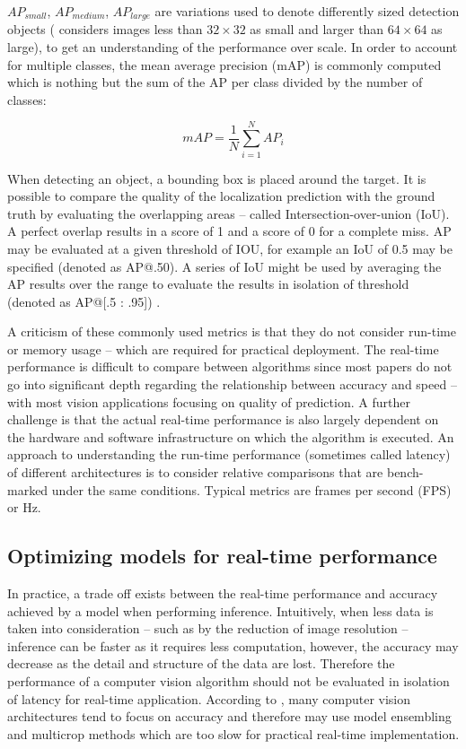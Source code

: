 \documentclass[a4paper,twoside,12pt]{report}
\begin{document}
$AP_{small}$, $AP_{medium}$, $AP_{large}$ are variations used to denote differently sized detection objects (\cite{cocoeval} considers images less than $32 \times 32$ as small and larger than $64 \times 64$ as large), to get an understanding of the performance over scale. In order to account for multiple classes, the mean average precision (mAP) is commonly computed which is nothing but the sum of the AP per class divided by the number of classes:

\begin{equation}
mAP = \frac{1}{N}\sum_{i=1}^{N} AP_{i}
\end{equation}

When detecting an object, a bounding box is placed around the target. It is possible to compare the quality of the localization prediction with the ground truth by evaluating the overlapping areas -- called Intersection-over-union (IoU). A perfect overlap results in a score of 1 and a score of 0 for a complete miss. AP may be evaluated at a given threshold of IOU, for example an IoU of 0.5 may be specified (denoted as AP@.50). A series of IoU might be used by averaging the AP results over the range to evaluate the results in isolation of threshold (denoted as AP@[.5 : .95]) \citep{pmetrics}.

A criticism of these commonly used metrics is that they do not consider run-time or memory usage -- which are required for practical deployment. The real-time performance is difficult to compare between algorithms since most papers do not go into significant depth regarding the relationship between accuracy and speed \citep{speedacc} -- with most vision applications focusing on quality of prediction. A further challenge is that the actual real-time performance is also largely dependent on the hardware and software infrastructure on which the algorithm is executed. An approach to understanding the run-time performance (sometimes called latency) of different architectures is to consider relative comparisons that are bench-marked under the same conditions. Typical metrics are frames per second (FPS) or Hz.

\newpage
\subsection{Optimizing models for real-time performance}

In practice, a trade off exists between the real-time performance and accuracy achieved by a model when performing inference. Intuitively, when less data is taken into consideration -- such as by the reduction of image resolution -- inference can be faster as it requires less computation, however, the accuracy may decrease as the detail and structure of the data are lost. Therefore the performance of a computer vision algorithm should not be evaluated in isolation of latency for real-time application. According to \cite{speedacc}, many computer vision architectures tend to focus on accuracy and therefore may use model ensembling and multicrop methods which are too slow for practical real-time implementation.
\end{document}
